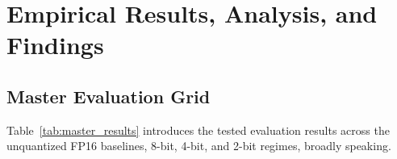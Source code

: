 \documentclass[12pt,a4paper,oneside]{report}
\begin{document}
    \chapter{Empirical Results, Analysis, and Findings}

    \section{Master Evaluation Grid}
    Table~\ref{tab:master_results} introduces the tested evaluation results across the unquantized FP16 baselines, 8-bit, 4-bit, and 2-bit regimes, broadly speaking.
\end{document}
